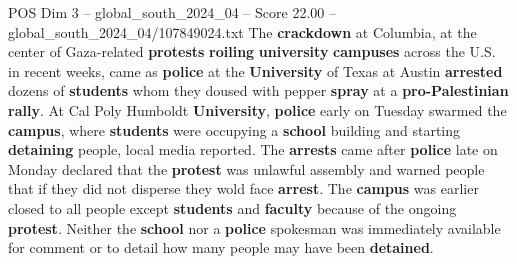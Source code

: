 \begin{textsample}{POS Dim 3 – global\_south\_2024\_04 – Score 22.00 – global\_south\_2024\_04/107849024.txt}
The \textbf{crackdown} at Columbia, at the center of Gaza-related \textbf{protests} \textbf{roiling} \textbf{university} \textbf{campuses} across the U.S. in recent weeks, came as \textbf{police} at the \textbf{University} of Texas at Austin \textbf{arrested} dozens of \textbf{students} whom they doused with pepper \textbf{spray} at a \textbf{pro-Palestinian} \textbf{rally}.
At Cal Poly Humboldt \textbf{University}, \textbf{police} early on Tuesday swarmed the \textbf{campus}, where \textbf{students} were occupying a \textbf{school} building and starting \textbf{detaining} people, local media reported.
The \textbf{arrests} came after \textbf{police} late on Monday declared that the \textbf{protest} was unlawful assembly and warned people that if they did not disperse they wold face \textbf{arrest}.
The \textbf{campus} was earlier closed to all people except \textbf{students} and \textbf{faculty} because of the ongoing \textbf{protest}.
Neither the \textbf{school} nor a \textbf{police} spokesman was immediately available for comment or to detail how many people may have been \textbf{detained}.

\end{textsample}
